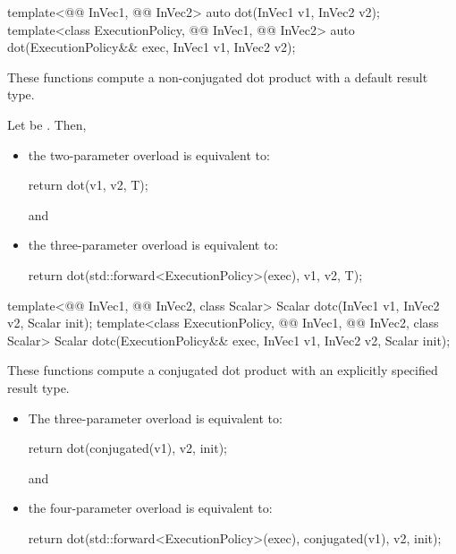 \begin{itemdecl}
  template<@@ InVec1, @@ InVec2>
    auto dot(InVec1 v1, InVec2 v2);
  template<class ExecutionPolicy, @@ InVec1, @@ InVec2>
    auto dot(ExecutionPolicy&& exec,
             InVec1 v1, InVec2 v2);
\end{itemdecl}

\begin{itemdescr}
\pnum
These functions compute a non-conjugated dot product with a default result type.

\pnum
\effects
Let  be
.
Then,
\begin{itemize}
\item
the two-parameter overload is equivalent to:
\begin{codeblock}
return dot(v1, v2, T{});
\end{codeblock}
and
\item
the three-parameter overload is equivalent to:
\begin{codeblock}
return dot(std::forward<ExecutionPolicy>(exec), v1, v2, T{});
\end{codeblock}
\end{itemize}
\end{itemdescr}

\begin{itemdecl}
template<@@ InVec1, @@ InVec2, class Scalar>
  Scalar dotc(InVec1 v1, InVec2 v2, Scalar init);
template<class ExecutionPolicy, @@ InVec1, @@ InVec2, class Scalar>
  Scalar dotc(ExecutionPolicy&& exec,
              InVec1 v1, InVec2 v2, Scalar init);
\end{itemdecl}

\begin{itemdescr}

\pnum
These functions compute a conjugated dot product
with an explicitly specified result type.

\pnum
\effects
\begin{itemize}
\item
The three-parameter overload is equivalent to:
\begin{codeblock}
return dot(conjugated(v1), v2, init);
\end{codeblock}
and
\item
the four-parameter overload is equivalent to:
\begin{codeblock}
return dot(std::forward<ExecutionPolicy>(exec), conjugated(v1), v2, init);
\end{codeblock}
\end{itemize}
\end{itemdescr}

